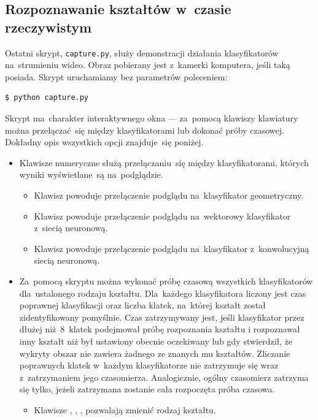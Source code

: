 \documentclass[11pt,a4paper]{article}
\begin{document}
\subsection{Rozpoznawanie kształtów w~czasie rzeczywistym}

Ostatni skrypt, \verb+capture.py+, służy demonstracji działania klasyfikatorów na~strumieniu wideo.
Obraz pobierany jest z~kamerki komputera, jeśli taką posiada.
Skrypt uruchamiamy bez parametrów poleceniem:
\begin{verbatim}
$ python capture.py
\end{verbatim}
Skrypt ma~charakter interaktywnego okna --- za~pomocą klawiszy klawiatury można przełączać~się między klasyfikatorami lub dokonać próby czasowej.
Dokładny opis wszystkich opcji znajduje~się poniżej.

\begin{itemize}
    \item Klawisze numeryczne służą przełączaniu~się między klasyfikatorami, których wyniki wyświetlane~są na~podglądzie.
    \begin{itemize}
        \item Klawisz  powoduje przełączenie podglądu na~klasyfikator geometryczny.
        \item Klawisz  powoduje przełączenie podglądu na~wektorowy klasyfikator z~siecią neuronową.
        \item Klawisz  powoduje przełączenie podglądu na~klasyfikator z~konwolucyjną siecią neuronową.
    \end{itemize}
    \item Za~pomocą skryptu można wykonać próbę czasową wszystkich klasyfikatorów dla~ustalonego rodzaju kształtu.
    Dla~każdego klasyfikatora liczony jest czas poprawnej klasyfikacji oraz liczba klatek, na~której kształt został zidentyfikowany pomyślnie.
    Czas zatrzymywany jest, jeśli klasyfikator przez dłużej niż~8~klatek podejmował próbę rozpoznania kształtu i rozpoznawał inny kształt niż był ustawiony obecnie oczekiwany lub gdy stwierdził, że wykryty obszar nie zawiera żadnego ze znanych mu kształtów. Zliczanie poprawnych klatek w~każdym klasyfikatorze nie zatrzymuje się wraz z~zatrzymaniem jego czasomierza. Analogicznie, ogólny czasomierz zatrzyma się tylko, jeżeli zatrzymana zostanie cała rozpoczęta próba czasowa.
    \begin{itemize}
        \item Klawisze , , ,  pozwalają zmienić rodzaj kształtu.
        \begin{itemize}

\end{itemize}
\end{itemize}
\end{itemize}
\end{document}
